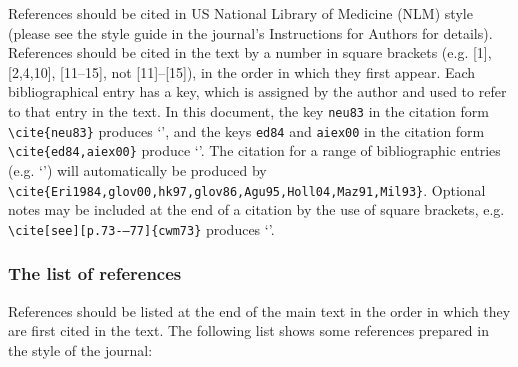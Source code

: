 \documentclass{tADR2e}
\begin{document}
References should be cited in US National Library of Medicine (NLM) style (please see the style guide in the journal's Instructions for Authors for details). References should be cited in the text by a number in square brackets (e.g. [1], [2,4,10], [11--15], not [11]--[15]), in the order in which they first appear. Each bibliographical entry has a key, which is assigned by the author and used to refer to that entry in the text. In this document, the key \verb"neu83" in the citation form \verb"\cite{neu83}" produces `\cite{neu83}', and the keys \verb"ed84" and \verb"aiex00" in the citation form
\verb"\cite{ed84,aiex00}" produce `\cite{ed84,aiex00}'. The citation for a range of bibliographic entries (e.g.
`\cite{Eri1984,glov00,hk97,glov86,Agu95,Holl04,Maz91,Mil93}') will automatically be produced by
\verb"\cite{Eri1984,glov00,hk97,glov86,Agu95,Holl04,Maz91,Mil93}". Optional notes may be included at the end of a citation by the use of square brackets, e.g. \verb"\cite[see][p.73-–77]{cwm73}" produces `\cite[see][p.73--77]{cwm73}'.


\subsubsection{The list of references}

References should be listed at the end of the main text in the order in which they are first cited in the text. The following list shows some references prepared in the style of the journal:
\end{document}
